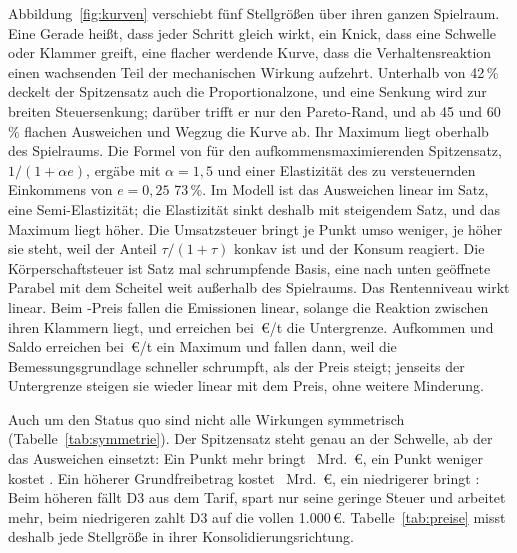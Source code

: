 Abbildung~\ref{fig:kurven} verschiebt fünf Stellgrößen über ihren ganzen
Spielraum. Eine Gerade heißt, dass jeder Schritt gleich wirkt, ein Knick, dass
eine Schwelle oder Klammer greift, eine flacher werdende Kurve, dass die
Verhaltensreaktion einen wachsenden Teil der mechanischen Wirkung aufzehrt.
Unterhalb von 42\,\% deckelt der Spitzensatz auch die Proportionalzone, und eine
Senkung wird zur breiten Steuersenkung; darüber trifft er nur den Pareto-Rand, und
ab 45 und 60\,\% flachen Ausweichen und Wegzug die Kurve ab. Ihr Maximum liegt
oberhalb des Spielraums. Die Formel von \textcite{saez2001} für den
aufkommensmaximierenden Spitzensatz, $1/(1+\alpha e)$, ergäbe mit $\alpha = 1{,}5$
und einer Elastizität des zu versteuernden Einkommens von $e = 0{,}25$
\parencite{saez2012} 73\,\%. Im Modell ist das Ausweichen linear im Satz, eine
Semi-Elastizität; die Elastizität sinkt deshalb mit steigendem Satz, und das
Maximum liegt höher. Die Umsatzsteuer bringt je Punkt umso weniger, je höher sie
steht, weil der Anteil $\tau/(1+\tau)$ konkav ist und der Konsum reagiert. Die
Körperschaftsteuer ist Satz mal schrumpfende Basis, eine nach unten geöffnete
Parabel mit dem Scheitel weit außerhalb des Spielraums. Das Rentenniveau wirkt
linear. Beim \COz-Preis fallen die Emissionen linear, solange die Reaktion
zwischen ihren Klammern liegt, und erreichen bei \COzBoden\,\euro/t die
Untergrenze. Aufkommen und Saldo erreichen bei \COzMax\,\euro/t ein Maximum und
fallen dann, weil die Bemessungsgrundlage schneller schrumpft, als der Preis
steigt; jenseits der Untergrenze steigen sie wieder linear mit dem Preis, ohne
weitere Minderung.

Auch um den Status quo sind nicht alle Wirkungen symmetrisch
(Tabelle~\ref{tab:symmetrie}). Der Spitzensatz steht genau an der Schwelle, ab der
das Ausweichen einsetzt: Ein Punkt mehr bringt ~Mrd.~\euro, ein
Punkt weniger kostet . Ein höherer Grundfreibetrag kostet
~Mrd.~\euro, ein niedrigerer bringt
: Beim höheren fällt D3 aus dem Tarif, spart nur seine
geringe Steuer und arbeitet mehr, beim niedrigeren zahlt D3 auf die vollen
1.000\,\euro. Tabelle~\ref{tab:preise} misst deshalb jede Stellgröße in ihrer
Konsolidierungsrichtung.

\newcommand{\kurve}[6]{%
  \nextgroupplot[title={#5}, xlabel={#3}, ylabel={#4},
    extra x ticks={\csname Wsq@#1\endcsname}, extra x tick labels={},
    extra x tick style={grid=major, major grid style={dashed, grau}}]
  \addplot[color=#6, very thick, mark=none] table[x=x, y=#2] {generiert/verlauf_#1.dat};}

